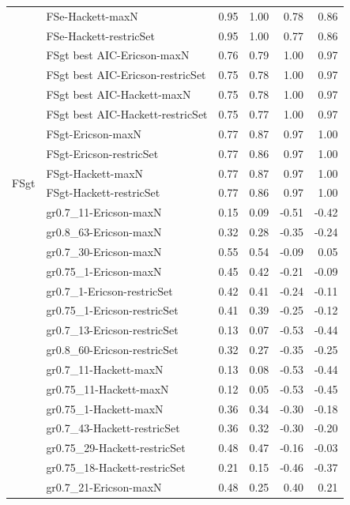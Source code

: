 {\begin{landscape}
\begin{footnotesize}
\begin{longtable}{@{}ll|rrrr@{}}
 & FSe-Hackett-maxN & 0.95 & 1.00 & 0.78 & 0.86 \\
 & FSe-Hackett-restricSet & 0.95 & 1.00 & 0.77 & 0.86 \\
\addlinespace
\multirow{6}{*}{FSgt} & FSgt best AIC-Ericson-maxN & 0.76 & 0.79 & 1.00 & 0.97 \\
 & FSgt best AIC-Ericson-restricSet & 0.75 & 0.78 & 1.00 & 0.97 \\
 & FSgt best AIC-Hackett-maxN & 0.75 & 0.78 & 1.00 & 0.97 \\
 & FSgt best AIC-Hackett-restricSet & 0.75 & 0.77 & 1.00 & 0.97 \\
 & FSgt-Ericson-maxN & 0.77 & 0.87 & 0.97 & 1.00 \\
 & FSgt-Ericson-restricSet & 0.77 & 0.86 & 0.97 & 1.00 \\
\multirow{2}{*}{FSgt} & FSgt-Hackett-maxN & 0.77 & 0.87 & 0.97 & 1.00 \\
 & FSgt-Hackett-restricSet & 0.77 & 0.86 & 0.97 & 1.00 \\
\addlinespace
\multirow{14}{*}{Iteroparity} & gr0.7\_11-Ericson-maxN & 0.15 & 0.09 & -0.51 & -0.42 \\
 & gr0.8\_63-Ericson-maxN & 0.32 & 0.28 & -0.35 & -0.24 \\
 & gr0.7\_30-Ericson-maxN & 0.55 & 0.54 & -0.09 & 0.05 \\
 & gr0.75\_1-Ericson-maxN & 0.45 & 0.42 & -0.21 & -0.09 \\
 & gr0.7\_1-Ericson-restricSet & 0.42 & 0.41 & -0.24 & -0.11 \\
 & gr0.75\_1-Ericson-restricSet & 0.41 & 0.39 & -0.25 & -0.12 \\
 & gr0.7\_13-Ericson-restricSet & 0.13 & 0.07 & -0.53 & -0.44 \\
 & gr0.8\_60-Ericson-restricSet & 0.32 & 0.27 & -0.35 & -0.25 \\
 & gr0.7\_11-Hackett-maxN & 0.13 & 0.08 & -0.53 & -0.44 \\
 & gr0.75\_11-Hackett-maxN & 0.12 & 0.05 & -0.53 & -0.45 \\
 & gr0.75\_1-Hackett-maxN & 0.36 & 0.34 & -0.30 & -0.18 \\
 & gr0.7\_43-Hackett-restricSet & 0.36 & 0.32 & -0.30 & -0.20 \\
 & gr0.75\_29-Hackett-restricSet & 0.48 & 0.47 & -0.16 & -0.03 \\
 & gr0.75\_18-Hackett-restricSet & 0.21 & 0.15 & -0.46 & -0.37 \\
\addlinespace
\multirow{11}{*}{EMR} & gr0.7\_21-Ericson-maxN & 0.48 & 0.25 & 0.40 & 0.21 \\

\end{longtable}
\end{footnotesize}
\end{landscape}}
